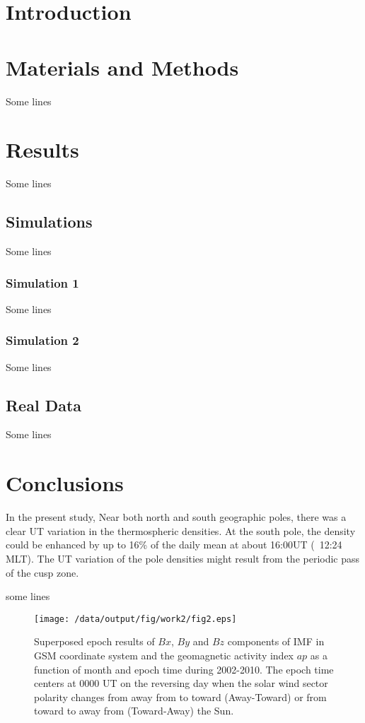 \documentclass[draft,grl]{/home/gdj/文档/template/agu_template/AGUTeX}
\begin{document}
\begin{article}
\section{Introduction}
\section{Materials and Methods}
    Some lines
\section{Results}
    Some lines
\subsection{Simulations}
    Some lines
\subsubsection{Simulation 1}
    Some lines
\subsubsection{Simulation 2}
    Some lines
\subsection{Real Data}
    Some lines
\section{Conclusions}
In the present study,  
Near both north and south geographic poles, there was a clear UT variation in the thermospheric densities. At the south pole, the density could be enhanced by up to 16\% of the daily mean at about 16:00UT (~12:24 MLT). The UT variation of the pole densities might result from the periodic pass of the cusp zone.
\begin{acknowledgments}

    some lines
\end{acknowledgments}


\end{article}
\begin{figure}
    \centering
    \noindent\texttt{[image: /data/output/fig/work2/fig2.eps]}
    \caption{Superposed epoch results of $Bx$, $By$ and $Bz$ components of IMF in GSM coordinate system and the geomagnetic activity index $ap$ as a function of month and epoch time during 2002-2010. The epoch time centers at 0000 UT on the reversing day when the solar wind sector polarity changes from away from to toward (Away-Toward) or from toward to away from (Toward-Away) the Sun. }
    \label{figure1}
\end{figure}
\end{document}
